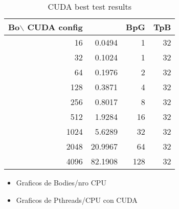     \begin{table}[h!]
        \centering
        \small
        \begin{tabular}{|r|r|r|r|}
            \hline
            Bo$\backslash$ CUDA config & & BpG & TpB \\ \hline
            16    &   0.0494   &   1  &  32 \\\hline
            32    &   0.1024   &   1  &  32 \\\hline
            64    &   0.1976   &   2  &  32 \\\hline
            128   &   0.3871   &   4  &  32 \\\hline
            256   &   0.8017   &   8  &  32 \\\hline
            512   &   1.9284   &  16  &  32 \\\hline
            1024  &   5.6289   &  32  &  32 \\\hline
            2048  &  20.9967   &  64  &  32 \\\hline
            4096  &  82.1908   & 128  &  32 \\\hline
        \end{tabular}
        \caption{CUDA best test results}
        \label{tab:cuda}
    \end{table}


\begin{itemize}
    \item Graficos de Bodies/nro CPU
    \item Graficos de Pthreads/CPU con CUDA
\end{itemize}

